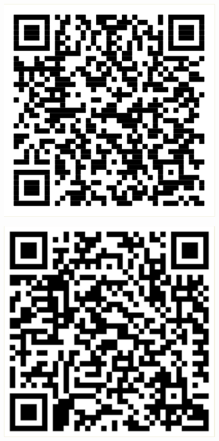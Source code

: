 \vspace{1cm}

\begin{figure}[H]
    \centering
    \includegraphics[width=0.5\linewidth]{textos//img/qrcode_rascunho_metas.png}
\end{figure}

\vspace{1cm}

\begin{figure}[H]
    \centering
    \includegraphics[width=0.5\linewidth]{textos//img/qrcode_projeto_academico_vigente.png}
\end{figure}